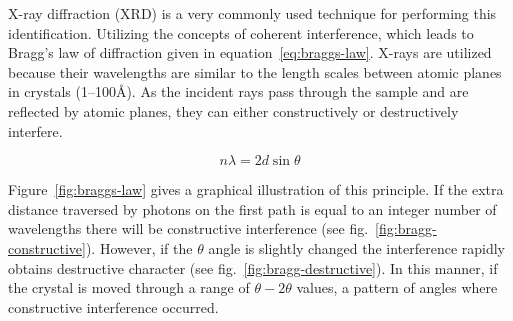 X-ray diffraction (XRD) is a very commonly used technique for performing this identification. Utilizing the concepts of coherent interference, which leads to Bragg's law of diffraction given in equation~\vref{eq:braggs-law}. X-rays are utilized because their wavelengths are similar to the length scales between atomic planes in crystals (1--100\AA). As the incident rays pass through the sample and are reflected by atomic planes, they can either constructively or destructively interfere. 

\begin{equation}
 \label{eq:braggs-law}
 \displaystyle
	n\lambda = 2d\sin\theta
\end{equation}

Figure~\vref{fig:braggs-law} gives a graphical illustration of this principle. If the extra distance traversed by photons on the first path is equal to an integer number of wavelengths there will be constructive interference (see fig.~\vref{fig:bragg-constructive}). However, if the $\theta$ angle is slightly changed the interference rapidly obtains destructive character (see fig.~\vref{fig:bragg-destructive}). In this manner, if the crystal is moved through a range of $\theta-2\theta$ values, a pattern of angles where constructive interference occurred. 

